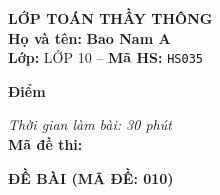 \noindent
\begin{tcolorbox}[colback=white,colframe=black,arc=0mm,boxrule=0.8pt,top=4pt,bottom=4pt,left=6pt,right=6pt]
	\begin{minipage}[c]{0.44\textwidth}
		{\bfseries\large LỚP TOÁN THẦY THÔNG}\\[3pt]
		\textbf{Họ và tên:} \textbf{\large Bao Nam A}\\[3pt]
		\textbf{Lớp:} LỚP 10 \quad -- \quad \textbf{Mã HS:} \texttt{HS035}
	\end{minipage}
	\hfill
	\begin{minipage}[c]{0.22\textwidth}
		\begin{tcolorbox}[colback=white,colframe=black,arc=0mm,boxrule=0.6pt,height=1.8cm,halign=center,valign=top,top=2pt]
			{\bfseries\normalsize Điểm}
		\end{tcolorbox}
	\end{minipage}
	\hfill
	\begin{minipage}[c]{0.30\textwidth}
		\raggedleft
		\textit{Thời gian làm bài: 30 phút}\\[4pt]
		\textbf{Mã đề thi:} 
	\end{minipage}
\end{tcolorbox}
\vspace{0.25cm}

\noindent\textbf{\large ĐỀ BÀI (MÃ ĐỀ: 010)}
\vspace{0.1cm}

